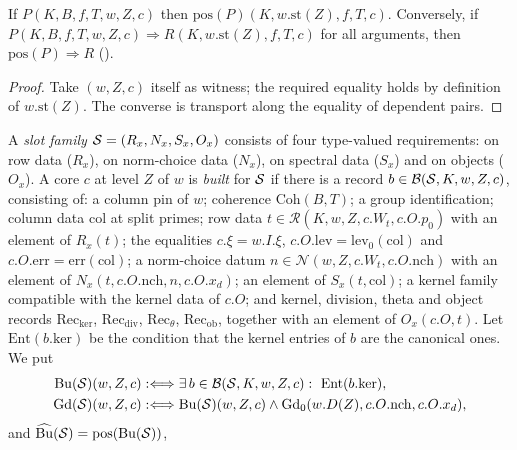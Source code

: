 \begin{lemma}\label{pf:baselat1:posintro}
If $P(K,B,f,T,w,Z,c)$ then $\mathrm{pos}(P)(K,w.\mathrm{st}(Z),f,T,c)$. Conversely, if
$P(K,B,f,T,w,Z,c)\Rightarrow R(K,w.\mathrm{st}(Z),f,T,c)$ for all arguments, then
$\mathrm{pos}(P)\Rightarrow R$ \textup{()}.
\end{lemma}

\begin{proof}
Take $(w,Z,c)$ itself as witness; the required equality holds by definition of $w.\mathrm{st}(Z)$. The
converse is transport along the equality of dependent pairs.
\end{proof}

\begin{definition}\label{pf:baselat1:def:built}
A \emph{slot family} $\mathcal S=(R_x,N_x,S_x,O_x)$ consists of four type-valued requirements: on row data
($R_x$), on norm-choice data ($N_x$), on spectral data ($S_x$) and on objects ($O_x$). A core $c$ at level $Z$
of $w$ is \emph{built} for $\mathcal S$ if there is a record $b\in\mathcal{B}(\mathcal S,K,w,Z,c)$,
consisting of: a column pin of $w$; coherence $\mathrm{Coh}(B,T)$; a group identification; column data
$\mathrm{col}$ at split primes; row data $t\in\mathcal{R}(K,w,Z,c.W_t,c.O.p_0)$ with an element of
$R_x(t)$; the equalities $c.\xi=w.I.\xi$, $c.O.\mathrm{lev}=\mathrm{lev}_0(\mathrm{col})$ and
$c.O.\mathrm{err}=\mathrm{err}(\mathrm{col})$; a norm-choice datum $n\in\mathcal{N}(w,Z,c.W_t,c.O.\mathrm{nch})$
with an element of $N_x(t,c.O.\mathrm{nch},n,c.O.x_d)$; an element of $S_x(t,\mathrm{col})$; a kernel family
compatible with the kernel data of $c.O$; and kernel, division, theta and object records
$\mathrm{Rec}_{\ker}$, $\mathrm{Rec}_{\mathrm{div}}$, $\mathrm{Rec}_{\theta}$, $\mathrm{Rec}_{\mathrm{ob}}$, together with an element of $O_x(c.O,t)$.
Let $\mathrm{Ent}(b.\mathrm{ker})$ be the condition that the kernel entries of $b$ are the canonical ones. We put
\begin{align*}
\mathrm{Bu}(\mathcal S)(w,Z,c)&:\Longleftrightarrow\exists\,b\in\mathcal{B}(\mathcal S,K,w,Z,c):\
  \mathrm{Ent}(b.\mathrm{ker}),\\
\mathrm{Gd}(\mathcal S)(w,Z,c)&:\Longleftrightarrow\mathrm{Bu}(\mathcal S)(w,Z,c)\wedge
  \mathrm{Gd}_0(w.D(Z),c.O.\mathrm{nch},c.O.x_d),
\end{align*}
and $\widehat{\mathrm{Bu}}(\mathcal S)=\mathrm{pos}(\mathrm{Bu}(\mathcal S))$,

\end{definition}
